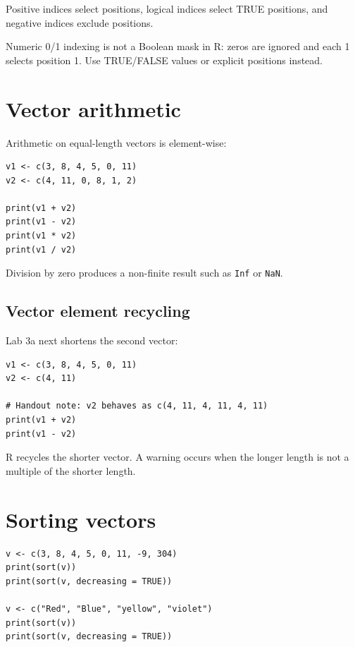 Positive indices select positions, logical indices select TRUE positions, and negative indices exclude positions.

\begin{pitfall}
Numeric 0/1 indexing is not a Boolean mask in R: zeros are ignored and each 1 selects position 1. Use TRUE/FALSE values or explicit positions instead.
\end{pitfall}

\section{Vector arithmetic}

Arithmetic on equal-length vectors is element-wise:

\begin{lstlisting}[style=dsr]
v1 <- c(3, 8, 4, 5, 0, 11)
v2 <- c(4, 11, 0, 8, 1, 2)

print(v1 + v2)
print(v1 - v2)
print(v1 * v2)
print(v1 / v2)
\end{lstlisting}

Division by zero produces a non-finite result such as \texttt{Inf} or \texttt{NaN}.

\subsection{Vector element recycling}

Lab 3a next shortens the second vector:

\begin{lstlisting}[style=dsr]
v1 <- c(3, 8, 4, 5, 0, 11)
v2 <- c(4, 11)

# Handout note: v2 behaves as c(4, 11, 4, 11, 4, 11)
print(v1 + v2)
print(v1 - v2)
\end{lstlisting}

R recycles the shorter vector. A warning occurs when the longer length is not a multiple of the shorter length.

\section{Sorting vectors}

\begin{lstlisting}[style=dsr]
v <- c(3, 8, 4, 5, 0, 11, -9, 304)
print(sort(v))
print(sort(v, decreasing = TRUE))

v <- c("Red", "Blue", "yellow", "violet")
print(sort(v))
print(sort(v, decreasing = TRUE))
\end{lstlisting}

